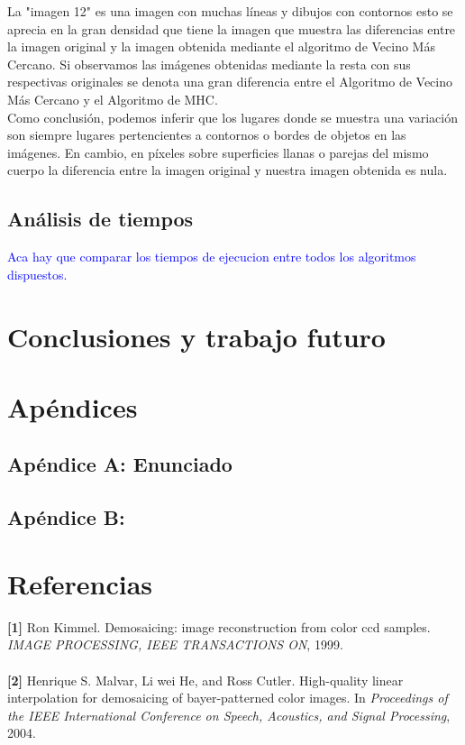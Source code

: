 \documentclass[a4paper]{article}
\begin{document}
La "imagen 12" es una imagen con muchas l\'ineas y dibujos con contornos esto se aprecia en la gran densidad que tiene la imagen que muestra las diferencias entre la imagen original y la imagen obtenida mediante el algoritmo de Vecino M\'as Cercano. Si observamos las im\'agenes obtenidas mediante la resta con sus respectivas originales se denota una gran diferencia entre el Algoritmo de Vecino M\'as Cercano y el Algoritmo de MHC.\\

Como conclusi\'on, podemos inferir que los lugares donde se muestra una variaci\'on son siempre lugares pertencientes a contornos o bordes de objetos en las im\'agenes. En cambio, en p\'ixeles sobre superficies llanas o parejas del mismo cuerpo la diferencia entre la imagen original y nuestra imagen obtenida es nula.


\subsection{An\'alisis de tiempos}
\textcolor{blue}{Aca hay que comparar los tiempos de ejecucion entre todos los algoritmos dispuestos.}

\newpage
\section{Conclusiones y trabajo futuro}





\section{Ap\'endices}
\subsection{Ap\'endice A: Enunciado} 


%

\subsection{Ap\'endice B:}
\newpage
\section{Referencias}
 
\textbf{[1]} Ron Kimmel. Demosaicing: image reconstruction from color ccd samples. \textit{IMAGE PROCESSING, IEEE TRANSACTIONS ON}, 1999. \\
\\

\textbf{[2]} Henrique S. Malvar, Li wei He, and Ross Cutler. High-quality linear interpolation for
demosaicing of bayer-patterned color images. In \textit{Proceedings of the IEEE International
Conference on Speech, Acoustics, and Signal Processing}, 2004.
\end{document}
